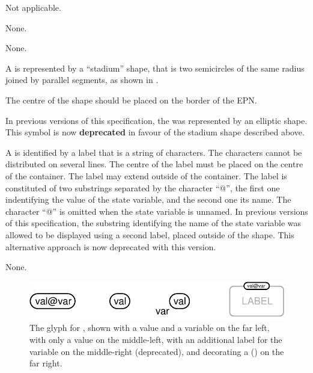 \begin{glyphDescription}

\glyphSboTerm
Not applicable.

\glyphIncoming
None.

\glyphOutgoing
None.

\glyphContainer
A  is represented by a ``stadium'' shape, that is two semicircles of the same radius joined by parallel segments, as shown in .

The centre of the shape should be placed on the border of the EPN.

In previous versions of this specification, the  was represented by an elliptic shape.
This symbol is now \textbf{deprecated} in favour of the stadium shape described above.

\glyphLabel
A  is identified by a label that is a string of characters.
The characters cannot be distributed on several lines.
The centre of the label must be placed on the centre of the container.
The label may extend outside of the container.
The label is constituted of two substrings separated by the character ``@'', the first one indentifying the value of the state variable, and the second one its name.
The character ``@'' is omitted when the state variable is unnamed.
In previous versions of this specification, the substring identifying the name of the state variable was allowed to be displayed using a second label, placed outside of the shape. This alternative approach is now deprecated with this version.

\glyphAux
None.

\end{glyphDescription}

\begin{figure}[H]
  \centering
  \includegraphics{images/build/state_variable.pdf}
  \caption{The \PD glyph for , shown with a value and a variable on the far left, with only a value on the middle-left, with an additional label for the variable on the middle-right (deprecated), and decorating a  () on the far right.}
  \label{fig:state-var}
\end{figure}

